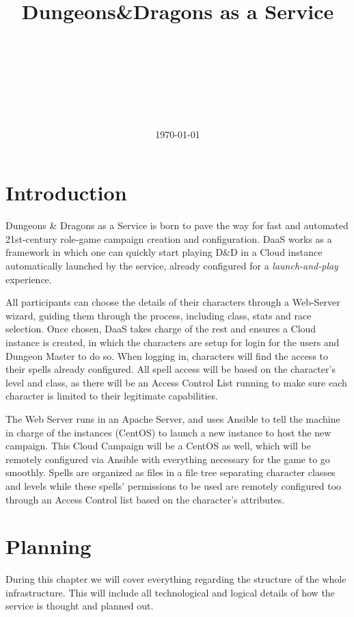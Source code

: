 \documentclass[a4paper,12pt]{report}
\title{{\Huge\textbf{Dungeons\&Dragons as a Service}}}
\author{\Large \firstauthor\\\Large \secondauthor\\\thirdauthor\\\fourthauthor\\\mbox{}\\\mbox{}\\\docversion}
\date{\today}
\begin{document}
\renewcommand{\thepage}{\roman{page}}
\maketitle
\tableofcontents
{}

\chapter{Introduction}
\setcounter{page}{1}
\renewcommand{\thepage}{\arabic{page}}

Dungeons \& Dragons as a Service is born to pave the way for fast and automated 21st-century role-game campaign creation and configuration. DaaS works as a framework in which one can quickly start playing D\&D in a Cloud instance automatically launched by the service, already configured for a \textit{launch-and-play} experience. 

All participants can choose the details of their characters through a Web-Server wizard, guiding them through the process, including class, stats and race selection. Once chosen, DaaS takes charge of the rest and ensures a Cloud instance is created, in which the characters are setup for login for the users and Dungeon Master to do so. When logging in, characters will find the access to their spells already configured. All spell access will be based on the character's level and class, as there will be an Access Control List running to make sure each character is limited to their legitimate capabilities.

The Web Server runs in an Apache Server, and uses Ansible to tell the machine in charge of the instances (CentOS) to launch a new instance to host the new campaign. This Cloud Campaign will be a CentOS as well, which will be remotely configured via Ansible with everything necessary for the game to go smoothly. Spells are organized as files in a file tree separating character classes and levels while these spells' permissions to be used are remotely configured too through an Access Control list based on the character's attributes.



\chapter{Planning}
\label{ch:plan}

During this chapter we will cover everything regarding the structure of the whole infrastructure. This will include all technological and logical details of how the service is thought and planned out.
\end{document}
